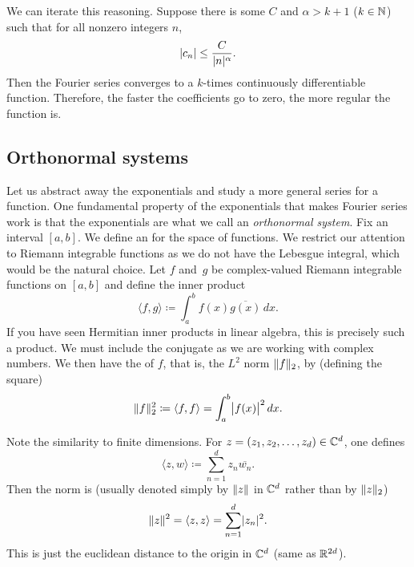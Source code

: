 We can iterate this reasoning.
Suppose there is
some $C$ and $\alpha > k+1$ ($k \in {\mathbb{N}}$) such that
for all nonzero integers $n$,
\begin{equation*}
\lvert {c_n} \rvert 
\leq \frac{C}{\lvert {n} \rvert^\alpha} .
\end{equation*}
Then 
the Fourier series converges to a $k$-times continuously differentiable
function.  Therefore, the faster the coefficients go to zero, the more
regular the function is.

\subsection{Orthonormal systems}

Let us abstract away the exponentials and
study a more general series for a function.
One fundamental property of the exponentials that makes Fourier series work
is that the exponentials are what we call an \emph{orthonormal system}.
Fix an interval $[a,b]$.  We define an
\emph{} for the space of functions.  We restrict our attention
to Riemann integrable functions as we do not have the Lebesgue
integral, which
would be the natural choice.  Let $f$ and~$g$ be complex-valued 
Riemann integrable functions on $[a,b]$ and define the inner product
\begin{equation*}
\langle f , g \rangle \coloneqq
\int_a^b f(x) \overline{g(x)} \, dx .
\end{equation*}
If you have seen Hermitian inner products in linear algebra, this
is precisely such a product.  We must include the conjugate as we are
working with complex numbers.  We then have the  of $f$, that
is, the $L^2$ norm $\lVert {f} \rVert_2$, by (defining the square)
\begin{equation*}
\lVert {f} \rVert_2^2 \coloneqq
\langle f , f \rangle =
\int_a^b \bigl\lvert {f(x)} \bigr\rvert^2 \, dx .
\end{equation*}

\begin{remark}
Note the similarity to finite dimensions.
For $z = (z_1,z_2,\ldots,z_d) \in {\mathbb{C}}^d$, one defines
\begin{equation*}
\langle z , w \rangle \coloneqq
\sum_{n=1}^d z_n \overline{w_n} .
\end{equation*}
Then the norm is (usually denoted simply by $\lVert {z} \rVert$ in ${\mathbb{C}}^d$
rather than by $\lVert {z} \rVert_2$)
\begin{equation*}
\snorm{z}^2 = 
\langle z , z \rangle =
\sum_{n=1}^d \sabs{z_n}^2 .
\avoidbreak
\end{equation*}
This is just the euclidean distance to the origin in ${\mathbb{C}}^d$ (same as
${\mathbb{R}}^{2d}$).
\end{remark}

